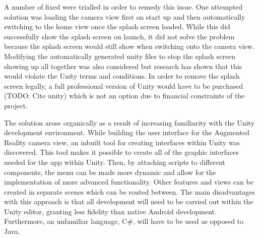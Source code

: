 \documentclass{l4proj}
\begin{document}
A number of fixed were trialled in order to remedy this issue. One attempted solution was loading the camera view first on start up and then automatically switching to the home view once the splash screen loaded. While this did successfully show the splash screen on launch, it did not solve the problem because the splash screen would still show when switching onto the camera view. Modifying the automatically generated unity files to stop the splash screen showing up all together was also considered but research has shown that this would violate the Unity terms and conditions. In order to remove the splash screen legally, a full professional version of Unity would have to be purchased (TODO: Cite unity) which is not an option due to financial constraints of the project.

The solution arose organically as a result of increasing familiarity with the Unity development environment. While building the user interface for the Augmented Reality camera view, an inbuilt tool for creating interfaces within Unity was discovered. This tool makes it possible to create all of the graphic interfaces needed for the app within Unity. Then, by attaching scripts to different components, the menu can be made more dynamic and allow for the implementation of more advanced functionality. Other features and views can be created in separate scenes which can be routed between. The main disadvantages with this approach is that all development will need to be carried out within the Unity editor, granting less fidelity than native Android development. Furthermore, an unfamiliar language, C\#, will have to be used as opposed to Java.
\end{document}
